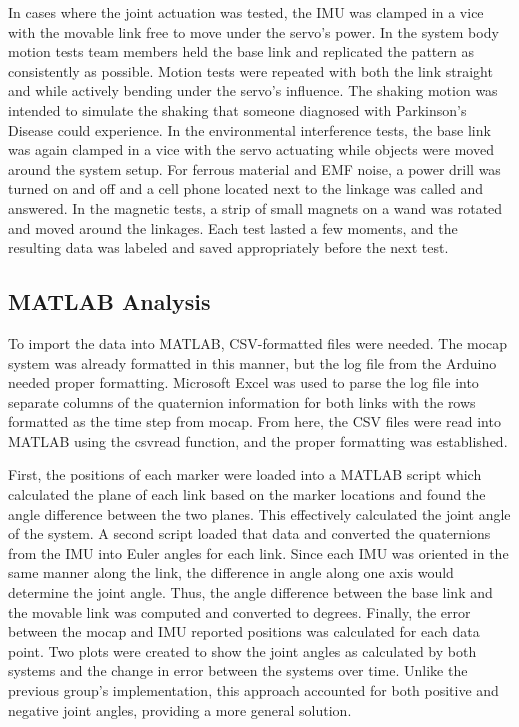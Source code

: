 \documentclass[letterpaper, 10 pt, conference]{ieeeconf}  %
\begin{document}
In cases where the joint actuation was tested, the IMU was clamped in a vice with the movable link free to move under the servo's power. In the system body motion tests team members held the base link and replicated the pattern as consistently as possible. Motion tests were repeated with both the link straight and while actively bending under the servo's influence. The shaking motion was intended to simulate the shaking that someone diagnosed with Parkinson's Disease could experience. In the environmental interference tests, the base link was again clamped in a vice with the servo actuating while objects were moved around the system setup. For ferrous material and EMF noise, a power drill was turned on and off and a cell phone located next to the linkage was called and answered. In the magnetic tests, a strip of small magnets on a wand was rotated and moved around the linkages. Each test lasted a few moments, and the resulting data was labeled and saved appropriately before the next test.

\subsection{MATLAB Analysis}
To import the data into MATLAB, CSV-formatted files were needed. The mocap system was already formatted in this manner, but the log file from the Arduino needed proper formatting. Microsoft Excel was used to parse the log file into separate columns of the quaternion information for both links with the rows formatted as the time step from mocap. From here, the CSV files were read into MATLAB using the csvread function, and the proper formatting was established. 

First, the positions of each marker were loaded into a MATLAB script which calculated the plane of each link based on the marker locations and found the angle difference between the two planes. This effectively calculated the joint angle of the system. A second script loaded that data and converted the quaternions from the IMU into Euler angles for each link. Since each IMU was oriented in the same manner along the link, the difference in angle along one axis would determine the joint angle. Thus, the angle difference between the base link and the movable link was computed and converted to degrees. Finally, the error between the mocap and IMU reported positions was calculated for each data point. Two plots were created to show the joint angles as calculated by both systems and the change in error between the systems over time. Unlike the previous group's implementation, this approach accounted for both positive and negative joint angles, providing a more general solution.
\end{document}
